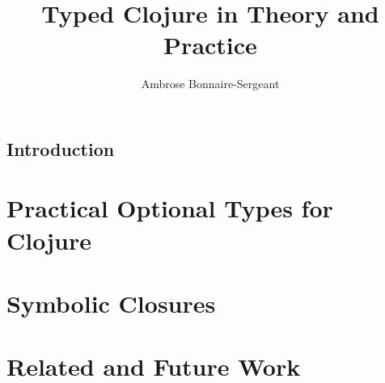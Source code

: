 \documentclass{book}
\title{Typed Clojure in Theory and Practice}
\author{Ambrose Bonnaire-Sergeant}
\begin{document}
\frontmatter %

\maketitle

\tableofcontents

\newpage

\mainmatter

\chapter{Introduction}



\part{Practical Optional Types for Clojure}
\label{part:types}










\part{%
Symbolic Closures}
\label{part:symbolic-closures}



\part{Related and Future Work}
\label{part:related-future-work}

%

%

\end{document}
